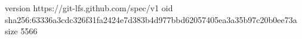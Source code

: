 version https://git-lfs.github.com/spec/v1
oid sha256:63336a3cdc326f31fa2424e7d383b4d977bbd62057405ea3a35b97c20b0ee73a
size 5566
